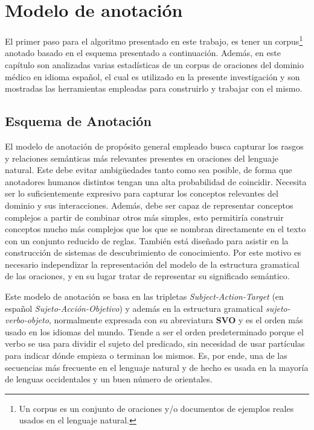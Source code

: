 \chapter{Modelo de anotación}\label{chapter:corpus-description}
El primer paso para el algoritmo presentado en este trabajo, es tener un corpus\footnote{Un corpus es un conjunto de oraciones y/o documentos de ejemplos reales usados en el lenguaje natural.} anotado basado en el esquema presentado a continuación. Además, en este capítulo son analizadas varias estadísticas de un corpus de oraciones del dominio médico en idioma español, el cual es utilizado en la presente investigación y son mostradas las herramientas empleadas para construirlo y trabajar con el mismo.


\section{Esquema de Anotación}
El modelo de anotación de propósito general empleado busca capturar los rasgos y relaciones semánticas más relevantes presentes en oraciones del lenguaje natural. Este debe evitar ambigüedades tanto como sea posible, de forma que anotadores humanos distintos tengan una alta probabilidad de coincidir. Necesita ser lo suficientemente expresivo para capturar los conceptos relevantes del dominio y sus interacciones. Además, debe ser capaz de representar conceptos complejos a partir de combinar otros más simples, esto permitiría construir conceptos mucho más complejos que los que se nombran directamente en el texto con un conjunto reducido de reglas. También está diseñado para asistir en la construcción de sistemas de descubrimiento de conocimiento. Por este motivo es necesario independizar la representación del modelo de la estructura gramatical de las oraciones, y en su lugar tratar de representar su significado semántico.

Este modelo de anotación se basa en las tripletas {\it Subject-Action-Target} (en español \textit{Sujeto-Acción-Objetivo}) y además en la estructura gramatical {\it sujeto-verbo-objeto}, normalmente expresada con su abreviatura \textbf{SVO} y es el orden más usado en los idiomas del mundo. Tiende a ser el orden predeterminado porque el verbo se usa para dividir el sujeto del predicado, sin necesidad de usar partículas para indicar dónde empieza o terminan los mismos. Es, por ende, una de las secuencias más frecuente en el lenguaje natural y de hecho es usada en la mayoría de lenguas occidentales y un buen número de orientales.

